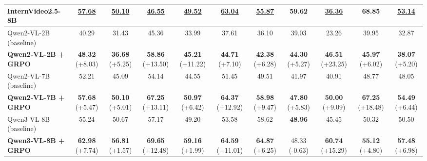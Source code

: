 {\begin{table}[t]
{\begin{tabular}{l cc cc cc cc cc}
InternVideo2.5-8B             & \underline{57.68} & \underline{50.10} & \underline{46.55} & \underline{49.52} & \underline{63.04} & \underline{55.87} & 59.62 & \underline{36.36} & 68.85 & \underline{53.14} \\
\midrule
Qwen2-VL-2B (baseline)        & 40.29 & 31.43 & 45.36 & 33.99 & 37.61 & 36.10 & 39.03 & 23.26 & 39.95 & 32.87 \\
\textbf{Qwen2-VL-2B + GRPO}
& \textbf{48.32} \textcolor{green!70!black}{\small(+8.03)} & \textbf{36.68} \textcolor{green!70!black}{\small(+5.25)}
& \textbf{58.86} \textcolor{green!70!black}{\small(+13.50)} & \textbf{45.21} \textcolor{green!70!black}{\small(+11.22)}
& \textbf{44.71} \textcolor{green!70!black}{\small(+7.10)} & \textbf{42.38} \textcolor{green!70!black}{\small(+6.28)}
& \textbf{44.30} \textcolor{green!70!black}{\small(+5.27)} & \textbf{46.51} \textcolor{green!70!black}{\small(+23.25)}
& \textbf{45.97} \textcolor{green!70!black}{\small(+6.02)} & \textbf{38.07} \textcolor{green!70!black}{\small(+5.20)} \\
\midrule
Qwen2-VL-7B (baseline)        & 52.21 & 45.09 & 54.14 & 44.55 & 51.45 & 49.51 & 41.97 & 40.91 & 48.77 & 48.05 \\
\textbf{Qwen2-VL-7B + GRPO}
& \textbf{57.68} \textcolor{green!70!black}{\small(+5.47)} & \textbf{50.10} \textcolor{green!70!black}{\small(+5.01)}
& \textbf{67.25} \textcolor{green!70!black}{\small(+13.11)} & \textbf{50.97} \textcolor{green!70!black}{\small(+6.42)}
& \textbf{64.37} \textcolor{green!70!black}{\small(+12.92)} & \textbf{58.98} \textcolor{green!70!black}{\small(+9.47)}
& \textbf{47.80} \textcolor{green!70!black}{\small(+5.83)} & \textbf{50.00} \textcolor{green!70!black}{\small(+9.09)}
& \textbf{67.25} \textcolor{green!70!black}{\small(+18.48)} & \textbf{54.49} \textcolor{green!70!black}{\small(+6.44)} \\
\midrule
Qwen3-VL-8B (baseline)        & 55.24 & 50.67 & 57.17 & 49.20 & 53.58 & 58.62 & \textbf{48.96} & 45.45 & 50.32 & 50.50 \\
\textbf{Qwen3-VL-8B + GRPO}
& \textbf{62.98} \textcolor{green!70!black}{\small(+7.74)} & \textbf{56.81} \textcolor{green!70!black}{\small(+1.57)}
& \textbf{69.65} \textcolor{green!70!black}{\small(+12.48)} & \textbf{59.16} \textcolor{green!70!black}{\small(+1.99)}
& \textbf{64.59} \textcolor{green!70!black}{\small(+11.01)} & \textbf{64.87} \textcolor{green!70!black}{\small(+6.25)}
& 48.33 \textcolor{red!70!black}{\small(-0.63)} & \textbf{60.74} \textcolor{green!70!black}{\small(+15.29)}
& \textbf{55.12} \textcolor{green!70!black}{\small(+4.80)} & \textbf{57.48} \textcolor{green!70!black}{\small(+6.98)} \\
\bottomrule
\end{tabular}}
\label{tab:doravqa_main}
\end{table}
}

